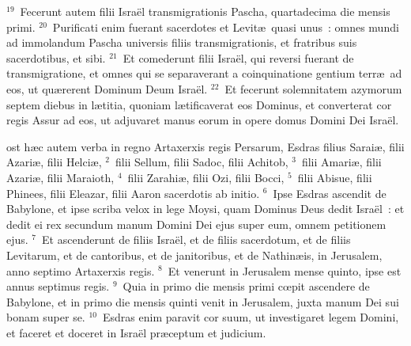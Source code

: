 ${}^{19}$~Fecerunt autem filii Isra\"el transmigrationis Pascha, quartadecima die mensis primi.
${}^{20}$~Purificati enim fuerant sacerdotes et Levit\ae\ quasi unus~: omnes mundi ad immolandum Pascha universis filiis transmigrationis, et fratribus suis sacerdotibus, et sibi.
${}^{21}$~Et comederunt filii Isra\"el, qui reversi fuerant de transmigratione, et omnes qui se separaverant a coinquinatione gentium terr\ae\ ad eos, ut qu\ae rerent Dominum Deum Isra\"el.
${}^{22}$~Et fecerunt solemnitatem azymorum septem diebus in l\ae titia, quoniam l\ae tificaverat eos Dominus, et converterat cor regis Assur ad eos, ut adjuvaret manus eorum in opere domus Domini Dei Isra\"el.

\bchapter
{}ost h\ae c autem verba in regno Artaxerxis regis Persarum, Esdras filius Sarai\ae , filii Azari\ae , filii Helci\ae ,
${}^{2}$~filii Sellum, filii Sadoc, filii Achitob,
${}^{3}$~filii Amari\ae , filii Azari\ae , filii Maraioth,
${}^{4}$~filii Zarahi\ae , filii Ozi, filii Bocci,
${}^{5}$~filii Abisue, filii Phinees, filii Eleazar, filii Aaron sacerdotis ab initio.
${}^{6}$~Ipse Esdras ascendit de Babylone, et ipse scriba velox in lege Moysi, quam Dominus Deus dedit Isra\"el~: et dedit ei rex secundum manum Domini Dei ejus super eum, omnem petitionem ejus.
${}^{7}$~Et ascenderunt de filiis Isra\"el, et de filiis sacerdotum, et de filiis Levitarum, et de cantoribus, et de janitoribus, et de Nathin\ae is, in Jerusalem, anno septimo Artaxerxis regis.
${}^{8}$~Et venerunt in Jerusalem mense quinto, ipse est annus septimus regis.
${}^{9}$~Quia in primo die mensis primi cœpit ascendere de Babylone, et in primo die mensis quinti venit in Jerusalem, juxta manum Dei sui bonam super se.
${}^{10}$~Esdras enim paravit cor suum, ut investigaret legem Domini, et faceret et doceret in Isra\"el pr\ae ceptum et judicium.


